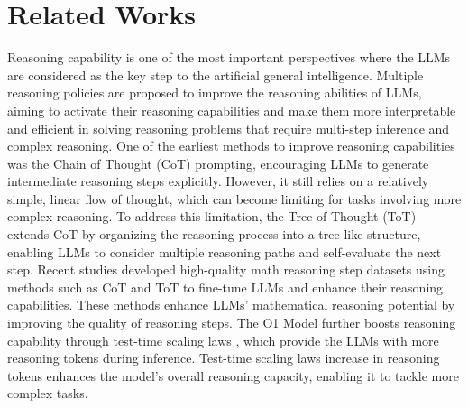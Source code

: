 \section{Related Works}
Reasoning capability is one of the most important perspectives where the LLMs are considered as the key step to the artificial general intelligence. Multiple reasoning policies are proposed to improve the reasoning abilities of LLMs, aiming to activate their reasoning capabilities and make them more interpretable and efficient in solving reasoning problems that require multi-step inference and complex reasoning. One of the earliest methods to improve reasoning capabilities was the Chain of Thought (CoT) \cite{wei2022cot} prompting, encouraging LLMs to generate intermediate reasoning steps explicitly. However, it still relies on a relatively simple, linear flow of thought, which can become limiting for tasks involving more complex reasoning. To address this limitation, the Tree of Thought (ToT) \cite{yao2024tree} extends CoT by organizing the reasoning process into a tree-like structure, enabling LLMs to consider multiple reasoning paths and self-evaluate the next step. Recent studies \cite{yu2023metamath, luo2023wizardmath, yue2023mammoth, gou2023tora} developed high-quality math reasoning step datasets using methods such as CoT and ToT to fine-tune LLMs and enhance their reasoning capabilities. These methods enhance LLMs' mathematical reasoning potential by improving the quality of reasoning steps. The O1 Model \cite{openai2024o1, openai2024o1_mini} further boosts reasoning capability through test-time scaling laws \cite{snell2024scaling}, which provide the LLMs with more reasoning tokens during inference. Test-time scaling laws increase in reasoning tokens enhances the model’s overall reasoning capacity, enabling it to tackle more complex tasks.

